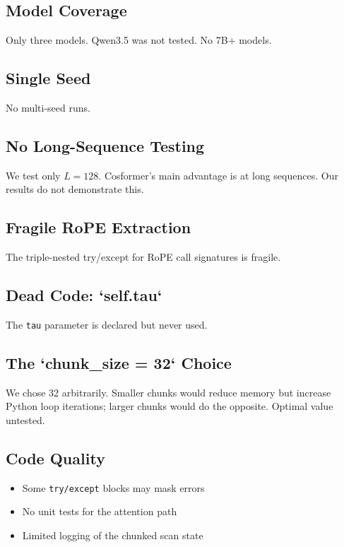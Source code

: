 \subsection{Model Coverage}

Only three models. Qwen3.5 was not tested. No 7B+ models.

\subsection{Single Seed}

No multi-seed runs.

\subsection{No Long-Sequence Testing}

We test only $L = 128$. Cosformer's main advantage is at long sequences. 
Our results do not demonstrate this.

\subsection{Fragile RoPE Extraction}

The triple-nested try/except for RoPE call signatures is fragile.

\subsection{Dead Code: `self.tau`}

The \texttt{tau} parameter is declared but never used.

\subsection{The `chunk\_size = 32` Choice}

We chose 32 arbitrarily. Smaller chunks would reduce memory but increase 
Python loop iterations; larger chunks would do the opposite. Optimal value 
untested.

\subsection{Code Quality}

\begin{itemize}
\item Some \texttt{try/except} blocks may mask errors
\item No unit tests for the attention path
\item Limited logging of the chunked scan state

\end{itemize}
